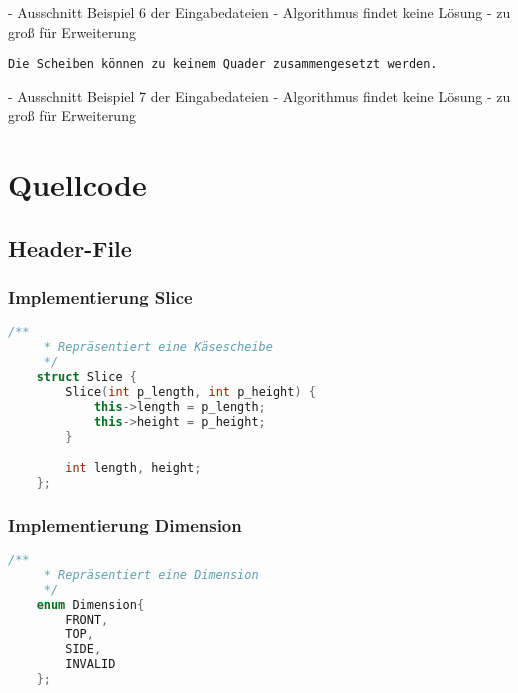 \documentclass[a4paper,10pt,ngerman]{scrartcl}
\begin{document}
    - Ausschnitt Beispiel 6 der Eingabedateien
    - Algorithmus findet keine Lösung
    - zu groß für Erweiterung

    \begin{lstlisting}[frame=single, title=Programmausgabe kaese7.txt, breaklines=true,label={lst:lstlisting12}]
    Die Scheiben können zu keinem Quader zusammengesetzt werden.
    \end{lstlisting}

    - Ausschnitt Beispiel 7 der Eingabedateien
    - Algorithmus findet keine Lösung
    - zu groß für Erweiterung


    \newpage


    \section{Quellcode}
    \label{sec:quellcode}
    \label{LastPage}

    \subsection{Header-File}\label{subsec:header-file}

    \subsubsection{Implementierung Slice}

    \begin{lstlisting}[frame=single,language=C++,title=Struct Slice,breaklines=true,label={lst:code_slice}]
    /**
     * Repräsentiert eine Käsescheibe
     */
    struct Slice {
        Slice(int p_length, int p_height) {
            this->length = p_length;
            this->height = p_height;
        }

        int length, height;
    };
    \end{lstlisting}

    \subsubsection{Implementierung Dimension}
    \begin{lstlisting}[frame=single,language=C++,title=Enum Dimension,breaklines=true,label={lst:code_dimension}]
    /**
     * Repräsentiert eine Dimension
     */
    enum Dimension{
        FRONT,
        TOP,
        SIDE,
        INVALID
    };
    \end{lstlisting}
\end{document}
